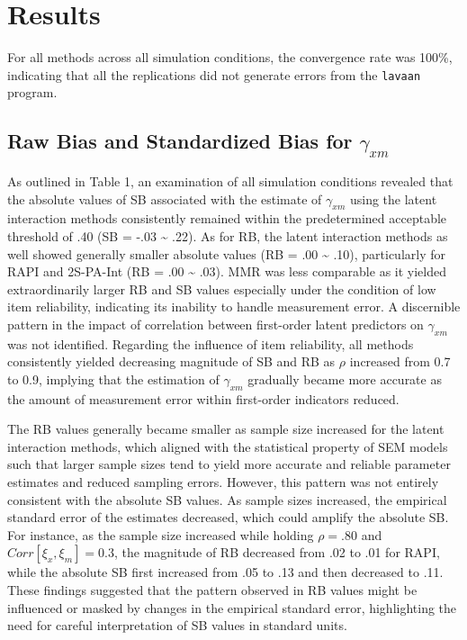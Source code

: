 \documentclass[
  man]{apa6}
\begin{document}
\section{Results}\label{results}

For all methods across all simulation conditions, the convergence rate was 100\%, indicating that all the replications did not generate errors from the \texttt{lavaan} program.

\subsection{\texorpdfstring{Raw Bias and Standardized Bias for \(\gamma_{xm}\)}{Raw Bias and Standardized Bias for \textbackslash gamma\_\{xm\}}}\label{raw-bias-and-standardized-bias-for-gamma_xm}

As outlined in Table 1, an examination of all simulation conditions revealed that the absolute values of SB associated with the estimate of \(\gamma_{xm}\) using the latent interaction methods consistently remained within the predetermined acceptable threshold of .40 (SB = -.03 \textasciitilde{} .22). As for RB, the latent interaction methods as well showed generally smaller absolute values (RB = .00 \textasciitilde{} .10), particularly for RAPI and 2S-PA-Int (RB = .00 \textasciitilde{} .03). MMR was less comparable as it yielded extraordinarily larger RB and SB values especially under the condition of low item reliability, indicating its inability to handle measurement error. A discernible pattern in the impact of correlation between first-order latent predictors on \(\gamma_{xm}\) was not identified. Regarding the influence of item reliability, all methods consistently yielded decreasing magnitude of SB and RB as \(\rho\) increased from 0.7 to 0.9, implying that the estimation of \(\gamma_{xm}\) gradually became more accurate as the amount of measurement error within first-order indicators reduced.

The RB values generally became smaller as sample size increased for the latent interaction methods, which aligned with the statistical property of SEM models such that larger sample sizes tend to yield more accurate and reliable parameter estimates and reduced sampling errors. However, this pattern was not entirely consistent with the absolute SB values. As sample sizes increased, the empirical standard error of the estimates decreased, which could amplify the absolute SB. For instance, as the sample size increased while holding \(\rho = .80\) and \(Corr[\xi_{x}, \xi_{m}] = 0.3\), the magnitude of RB decreased from .02 to .01 for RAPI, while the absolute SB first increased from .05 to .13 and then decreased to .11. These findings suggested that the pattern observed in RB values might be influenced or masked by changes in the empirical standard error, highlighting the need for careful interpretation of SB values in standard units.
\end{document}
